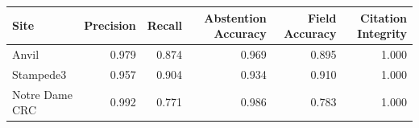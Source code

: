 \begin{tabular}{lrrrrr}
\toprule
Site & Precision & Recall & Abstention Accuracy & Field Accuracy & Citation Integrity \\
\midrule
Anvil & 0.979 & 0.874 & 0.969 & 0.895 & 1.000 \\
Stampede3 & 0.957 & 0.904 & 0.934 & 0.910 & 1.000 \\
Notre Dame CRC & 0.992 & 0.771 & 0.986 & 0.783 & 1.000 \\
\bottomrule
\end{tabular}
